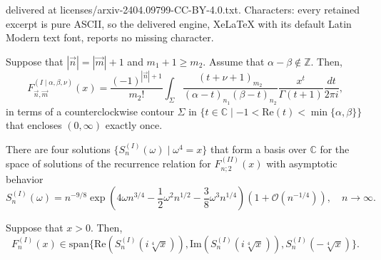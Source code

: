 \documentclass[10pt,a4paper]{amsart}
\newcommand{\BO}{\mathcal{O}}
\newcommand{\C}{\mathbb{C}}
\newcommand{\Z}{\mathbb{Z}}
\newcommand{\sz}[1]{\left| \vec{#1} \right|}
\begin{document}
delivered at licenses/arxiv-2404.09799-CC-BY-4.0.txt. Characters: every retained excerpt is pure ASCII, so the delivered engine, XeLaTeX with its default Latin Modern text font, reports no missing character.
\begin{prop} \label{I_int}
Suppose that $\sz{n}=\sz{m}+1$ and $m_1+1\geq m_2$. Assume that $\alpha-\beta\not\in\Z$. Then,
   $$ F_{\vec{n},\vec{m}}^{(I\mid \alpha,\beta,\nu)}(x) =  \frac{(-1)^{\sz{n}+1}}{m_2!} \int_\Sigma  \frac{(t+\nu+1)_{m_2} }{(\alpha-t)_{n_1}(\beta-t)_{n_2}} \frac{x^t}{\Gamma(t+1)} \frac{dt}{2\pi i}, $$
   in terms of a counterclockwise contour $\Sigma$ in $\{t\in\C\mid -1< \text{Re}(t) < \min\{\alpha,\beta\}\}$ that encloses $(0,\infty)$ exactly once.
\end{prop}

\begin{prop} \label{I_AQ_BT}
    There are four solutions $\{S_n^{(I)}(\omega) \mid \omega^4=x\}$ that form a basis over $\C$ for the space of solutions of the recurrence relation for $F_{n;2}^{(II)}(x)$ with asymptotic behavior
    $$S_{n}^{(I)}(\omega) = n^{-9/8} \exp\left(4\omega n^{3/4} - \frac{1}{2}\omega^2 n^{1/2} - \frac{3}{8}\omega^3 n^{1/4} \right) \left(1+\BO(n^{-1/4})\right),\quad n\to\infty.$$
\end{prop}

\begin{prop} \label{I_AQ_error}
    Suppose that $x>0$. Then,
    $$F_{n}^{(I)}(x) \in\text{span}\{\text{Re}(S_{n}^{(I)}(i\sqrt[4]{x})),\text{Im}(S_{n}^{(I)}(i\sqrt[4]{x})),S_n^{(I)}(-\sqrt[4]{x})\}.$$     
\end{prop}
\end{document}
